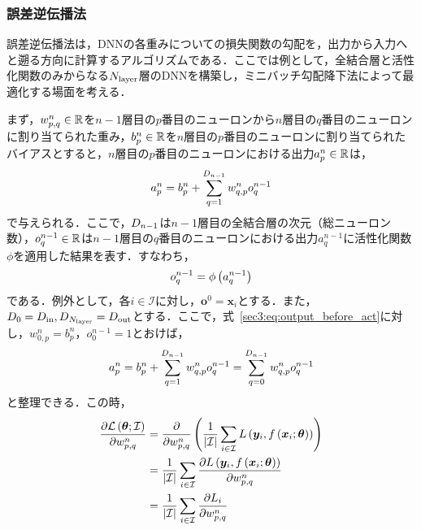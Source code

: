 \documentclass[12pt]{jarticle}
\numberwithin{equation}{section}    %
\numberwithin{figure}{section}      %
\numberwithin{table}{section}      %
\begin{document}
\subsubsection{誤差逆伝播法}
\label{sec3:sec:backpropagation}
誤差逆伝播法は，DNNの各重みについての損失関数の勾配を，出力から入力へと遡る方向に計算するアルゴリズムである．ここでは例として，全結合層と活性化関数のみからなる$N_{\text{layer}}$層のDNNを構築し，ミニバッチ勾配降下法によって最適化する場面を考える\cite{higham2019deep}．

まず，$w_{p, q}^{n} \in \mathbb{R}$を$n - 1$層目の$p$番目のニューロンから$n$層目の$q$番目のニューロンに割り当てられた重み，$b_{p}^{n} \in \mathbb{R}$を$n$層目の$p$番目のニューロンに割り当てられたバイアスとすると，$n$層目の$p$番目のニューロンにおける出力$a_{p}^{n} \in \mathbb{R}$は，
\begin{equation}
    \label{sec3:eq:output_before_act}
    a_{p}^{n} = b_{p}^{n} + \sum_{q = 1}^{D_{n - 1}} w_{q, p}^{n} o_{q}^{n - 1}
\end{equation}
で与えられる．ここで，$D_{n - 1}$は$n - 1$層目の全結合層の次元（総ニューロン数），$o_{q}^{n - 1} \in \mathbb{R}$は$n - 1$層目の$q$番目のニューロンにおける出力$a_{q}^{n - 1}$に活性化関数$\phi$を適用した結果を表す．すなわち，
\begin{equation}
    o_{q}^{n - 1} = \phi\left(a_{q}^{n - 1}\right)
\end{equation}
である．例外として，各$i \in \mathcal{I}$に対し，$\bm{o}^{0} = \bm{x}_{i}$とする．また，$D_{0} = D_{\text{in}}, D_{N_{\text{layer}}} = D_{\text{out}}$とする．ここで，式~\eqref{sec3:eq:output_before_act}に対し，$w_{0, p}^{n} = b_{p}^{n}$，$o_{0}^{n - 1} = 1$とおけば，
\begin{equation}
    \label{sec3:eq:output_before_act_2}
    a_{p}^{n} = b_{p}^{n} + \sum_{q = 1}^{D_{n - 1}} w_{q, p}^{n} o_{q}^{n - 1}
    = \sum_{q = 0}^{D_{n - 1}} w_{q, p}^{n} o_{q}^{n - 1}
\end{equation}
と整理できる．この時，
\begin{align}
    \pdv{\mathcal{L}\left(\bm{\theta}; \mathcal{I}\right)}{w_{p, q}^{n}} & = \pdv{w_{p, q}^{n}} \left(\frac{1}{|\mathcal{I}|} \sum_{i \in \mathcal{I}} L\left(\bm{y}_{i}, f\left(\bm{x}_{i}; \bm{\theta}\right)\right)\right) \\
                                                                                                & = \frac{1}{|\mathcal{I}|} \sum_{i \in \mathcal{I}} \pdv{L\left(\bm{y}_{i}, f\left(\bm{x}_{i}; \bm{\theta}\right)\right)}{w_{p, q}^{n}}     \\
                                                                                                & = \frac{1}{|\mathcal{I}|} \sum_{i \in \mathcal{I}} \pdv{L_{i}}{w_{p, q}^{n}}
\end{align}
\end{document}
